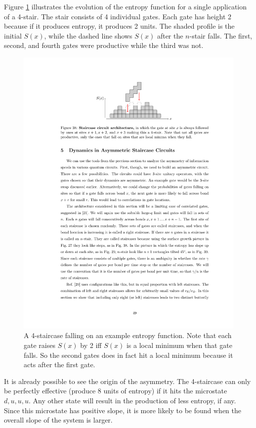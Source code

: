 \documentclass[aps,prx,reprint,superscriptaddress, longbibliography]{revtex4-1}
\begin{document}
Figure \ref{fig:stairs} illustrates the evolution of the entropy function for a single application of a 4-stair. The stair consists of 4 individual gates. Each gate has height 2 because if it produces entropy, it produces 2 units. The shaded profile is the initial $S(x)$, while the dashed line shows $S(x)$ after the $n$-stair falls. The first, second, and fourth gates were productive while the third was not.
\begin{figure}
	\includegraphics[width=\columnwidth]{stairs}
	\caption{A 4-staircase falling on an example entropy function. Note that each gate raises $S(x)$ by 2 iff $S(x)$ is a local minimum when that gate falls. So the second gates does in fact hit a local minimum because it acts after the first gate.}
	\label{fig:stairs}
\end{figure}
It is already possible to see the origin of the asymmetry. The 4-staircase can only be perfectly effective (produce 8 units of entropy) if it hits the microstate ${d,u,u,u}$. Any other state will result in the production of less entropy, if any. Since this microstate has positive slope, it is more likely to be found when the overall slope of the system is larger.
\end{document}
